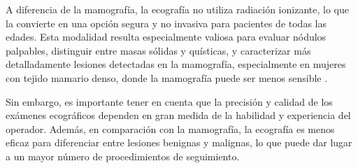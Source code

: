\documentclass[a4paper,10pt]{book}
\begin{document}
A diferencia de la mamografía, la ecografía no utiliza radiación ionizante, lo que la convierte en una opción segura y no invasiva para pacientes de todas las edades. Esta modalidad resulta especialmente valiosa para evaluar nódulos palpables, distinguir entre masas sólidas y quísticas, y caracterizar más detalladamente lesiones detectadas en la mamografía, especialmente en mujeres con tejido mamario denso, donde la mamografía puede ser menos sensible \cite{gokhale_ultrasound_2009}.

Sin embargo, es importante tener en cuenta que la precisión y calidad de los exámenes ecográficos dependen en gran medida de la habilidad y experiencia del operador. Además, en comparación con la mamografía, la ecografía es menos eficaz para diferenciar entre lesiones benignas y malignas, lo que puede dar lugar a un mayor número de procedimientos de seguimiento.
\end{document}
